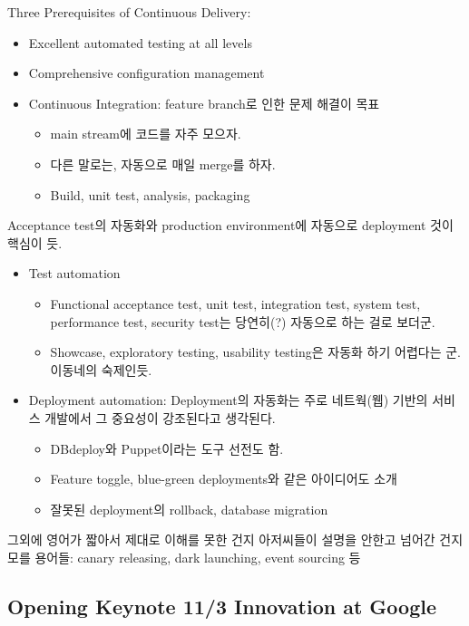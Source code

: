\documentclass[a4paper]{article}
\begin{document}
Three Prerequisites of Continuous Delivery:
\begin{itemize}
\item Excellent automated testing at all levels
\item Comprehensive configuration management
\item Continuous Integration: feature branch로 인한 문제 해결이 목표
  \begin{itemize}
  \item main stream에 코드를 자주 모으자.
  \item 다른 말로는, 자동으로 매일 merge를 하자.
  \item Build, unit test, analysis, packaging
  \end{itemize}
\end{itemize}

Acceptance test의 자동화와 production environment에 자동으로 deployment  것이 핵심이 듯. 
 
\begin{itemize}
\item Test automation
  \begin{itemize}
  \item Functional acceptance test, unit test, integration test, system test, performance test, security test는 당연히(?) 자동으로 하는 걸로 보더군.
  \item Showcase, exploratory testing, usability testing은 자동화 하기 어렵다는 군. 이동네의 숙제인듯.
  \end{itemize}
\item Deployment automation: Deployment의 자동화는 주로 네트웍(웹) 기반의 서비스 개발에서 그 중요성이 강조된다고 생각된다. 
  \begin{itemize}
  \item DBdeploy와 Puppet이라는 도구 선전도 함.
  \item Feature toggle, blue-green deployments와 같은 아이디어도 소개
  \item 잘못된 deployment의 rollback, database migration
  \end{itemize}
\end{itemize}
 
그외에 영어가 짧아서 제대로 이해를 못한 건지 아저씨들이 설명을 안한고 넘어간 건지 모를 용어들: canary releasing, dark launching, event sourcing 등
 
\subsection{Opening Keynote 11/3 Innovation at Google}
 
\end{document}
